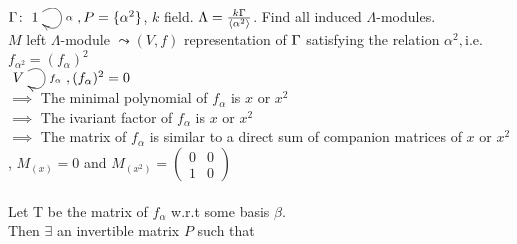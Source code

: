 \begin{exam}
$\G\colon \xymatrix{1 \ar@(ur,dr)^\alpha}, P=\{\alpha^2 \}$, $k$ field. $ \Lambda=\frac{k\Gamma}{\langle\alpha^2\rangle}$. Find all induced $\Lambda$-modules.\\
$M$ left $\Lambda$-module $\leadsto 
(V,f) $ representation of $\Gamma$ satisfying the relation $\alpha^2, $i.e.  $ f_{\alpha^2}=(f_\alpha)^2$\\  
	
	$\xymatrix{V \ar@(ur,dr)^{f_\alpha}}, (f_\alpha)^2=0$\\\newline
	$\implies$ The minimal polynomial of $f_\alpha$ is $x$ or $x^2$\\
	$\implies$ The ivariant factor of $f_\alpha$ is $x$ or $x^2$\\
	$\implies$ The matrix of $f_\alpha$ is similar to a direct sum of companion matrices of $x$ or $x^2$, $M_{(x)}=0$ and $M_{(x^2)}= \begin{pmatrix}0&0\\1&0\end{pmatrix}$\\~\\
	
Let T be the matrix of $f_\alpha$ w.r.t some basis $\beta$.\\
Then $\exists$ an invertible matrix $P$ such that\newline
	

\end{exam}
